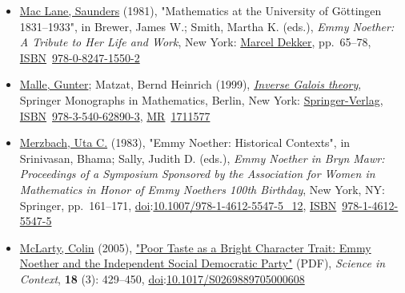 \begin{itemize}
  \href{https://en.wikipedia.org/wiki/Jakob_Levitzki}{Levitzki, Jakob} (1931), {\href{https://link.springer.com/article/10.1007/BF01174374}{"Über vollständig reduzible Ringe und Unterringe"}} {{[}}On Completely Reducible Rings and Subrings{{]}}, \emph{\href{https://en.wikipedia.org/wiki/Mathematische_Zeitschrift}{Mathematische Zeitschrift}} (in German), \textbf{33} (1): {663--}691, \href{https://en.wikipedia.org/wiki/Doi_(identifier)}{doi}:\href{https://doi.org/10.1007\%2FBF01174374}{10.1007/BF01174374}{}
\item
  \href{https://en.wikipedia.org/wiki/Saunders_Mac_Lane}{Mac Lane, Saunders} (1981), "Mathematics at the University of Göttingen 1831--1933", in Brewer, James W.; Smith, Martha K. (eds.), \emph{Emmy Noether: A Tribute to Her Life and Work}, New York: \href{https://en.wikipedia.org/wiki/Marcel_Dekker}{Marcel Dekker}, pp.{~}{65--}78, \href{https://en.wikipedia.org/wiki/ISBN_(identifier)}{ISBN}{~}\href{https://en.wikipedia.org/wiki/Special:BookSources/978-0-8247-1550-2}{978-0-8247-1550-2}{}
\item
  \href{https://en.wikipedia.org/wiki/Gunter_Malle}{Malle, Gunter}; Matzat, Bernd Heinrich (1999), {\href{https://archive.org/details/inversegaloisthe0000mall}{\emph{Inverse Galois theory}}}, Springer Monographs in Mathematics, Berlin, New York: \href{https://en.wikipedia.org/wiki/Springer-Verlag}{Springer-Verlag}, \href{https://en.wikipedia.org/wiki/ISBN_(identifier)}{ISBN}{~}\href{https://en.wikipedia.org/wiki/Special:BookSources/978-3-540-62890-3}{978-3-540-62890-3}, \href{https://en.wikipedia.org/wiki/MR_(identifier)}{MR}{~}\href{https://mathscinet.ams.org/mathscinet-getitem?mr=1711577}{1711577}{}
\item
  \href{https://en.wikipedia.org/wiki/Uta_Merzbach}{Merzbach, Uta C.} (1983), "Emmy Noether: Historical Contexts", in Srinivasan, Bhama; Sally, Judith D. (eds.), \emph{Emmy Noether in Bryn Mawr: Proceedings of a Symposium Sponsored by the Association for Women in Mathematics in Honor of Emmy Noether\textquotesingle s 100th Birthday}, New York, NY: Springer, pp.{~}{161--}171, \href{https://en.wikipedia.org/wiki/Doi_(identifier)}{doi}:\href{https://doi.org/10.1007\%2F978-1-4612-5547-5_12}{10.1007/978-1-4612-5547-5\_12}, \href{https://en.wikipedia.org/wiki/ISBN_(identifier)}{ISBN}{~}\href{https://en.wikipedia.org/wiki/Special:BookSources/978-1-4612-5547-5}{978-1-4612-5547-5}{}
\item
  \href{https://en.wikipedia.org/wiki/Colin_McLarty}{McLarty, Colin} (2005), \href{https://www.tau.ac.il/~corry/publications/articles/pdf/Noether-Larty.pdf}{"Poor Taste as a Bright Character Trait: Emmy Noether and the Independent Social Democratic Party"} {(PDF)}, \emph{Science in Context}, \textbf{18} (3): {429--}450, \href{https://en.wikipedia.org/wiki/Doi_(identifier)}{doi}:\href{https://doi.org/10.1017\%2FS0269889705000608}{10.1017/S0269889705000608}{}

\end{itemize}
